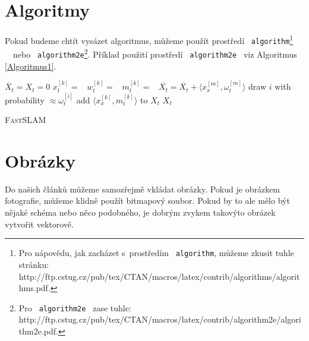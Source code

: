 \documentclass[11pt, a4paper]{article}
\begin{document}
\section{Algoritmy}\label{sec:sekce3}
Pokud budeme chtít vysázet algoritmus, můžeme použít prostředí \texttt{\ algorithm}\footnote{Pro nápovědu, jak zacházet s~prostředím \texttt{\ algorithm}, můžeme zkusit tuhle stránku:\\ http://ftp.cstug.cz/pub/tex/CTAN/macros/latex/contrib/algorithms/algorithms.pdf.} \ \ nebo \texttt{\ algorithm2e}\footnote{Pro \texttt{\ algorithm2e\ } zase tuhle: http://ftp.cstug.cz/pub/tex/CTAN/macros/latex/contrib/algorithm2e/algorithm2e.pdf.}. Příklad použití prostředí \texttt{\ algorithm2e\ } viz Algoritmus \ref{Algoritmus1}.

\begin{algorithm}\label{Algoritmus1}
 \begin{algorithmic}[1]
 \STATE $\overline{X_t}=X_t=0$
       \STATE\hspace{\algorithmicindent} $x^{[k]}_t= $\ 
       \STATE\hspace{\algorithmicindent} $w^{[k]}_t= $\ 
       \STATE\hspace{\algorithmicindent} $m^{[k]}_t= $\ 
       \STATE\hspace{\algorithmicindent} $\overline{X_t}=\overline{X_t}+ \big \langle x^{[m]}_x, \omega^{[m]}_t \big \rangle$
 \ENDFOR
 	\STATE\hspace{\algorithmicindent} draw $i$ with probability $\approx \omega^{[i]}_t$
    \STATE\hspace{\algorithmicindent} add $\big \langle x^{[k]}_x, m^{[k]}_t \big \rangle$ to $X_t$
 \ENDFOR
 \RETURN $X_t$
 \end{algorithmic}
 \caption{\textsc{Fast}SLAM}
\end{algorithm}

\section{Obrázky}

Do našich článků můžeme samozřejmě vkládat obrázky. Pokud je obrázkem fotografie,
můžeme klidně použít bitmapový soubor. Pokud by to ale mělo být nějaké schéma nebo
něco podobného, je dobrým zvykem takovýto obrázek vytvořit vektorově.
\end{document}
